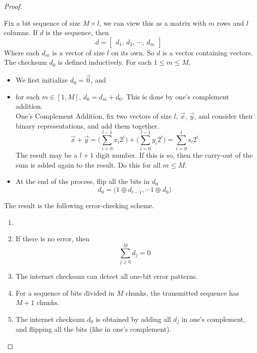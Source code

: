 \documentclass[../../main.tex]{subfiles}
\begin{document}
\begin{proof}
\begin{definition}
    Fix a bit sequence of size $M\times l$, we can view this as a matrix with $m$ rows and $l$ columns. If $d$ is the sequence, then
    \[d = \begin{bmatrix}d_1,\, d_2,\,\cdots,\,d_m\end{bmatrix}\]
    Where each $d_m$ is a vector of size $l$ on its own. So $d$ is a vector containing vectors.\\
    
    The checksum $d_0$ is defined inductively. For each $1\leq m\leq M$,
    \begin{itemize}
        \item We first initialize $d_0 = \vec{0}$, and
        \item for each $m\in[1,M]$, $d_0 = d_m + d_0$. This is done by one's complement addition.\\
        
        One's Complement Addition, fix two vectors of size $l$, $\vec{x}$, $\vec{y}$, and consider their binary representations, and add them together.
        \[
        \vec{x} + \vec{y} = \biggl(\sum_{i=0}^{l-1} x_i 2^i\biggr) + \biggl(\sum_{i=0}^{l-1} y_i 2^i\biggr) = \sum_{i=0}^{l} s_i 2^i
        \]
        The result may be a $l+1$ digit number. If this is so, then the carry-out of the sum is added again to the result. Do this for all $m\leq M$.\\
        \item At the end of the process, flip all the bits in $d_0$
        \[
        d_0 = \biggl(1\oplus d_{l-1},\cdots 1\oplus d_{0}\biggr)
        \]
    \end{itemize}
\end{definition}
    The result is the following error-checking scheme.
\begin{wtr}
\begin{enumerate}
        \item[]
        \item If there is no error, then
        \[
        \boxed{\sum_{j\geq 0}^M d_j=0}
        \]
        \item The internet checksum can detect all one-bit error patterns.
        \item For a sequence of bits divided in $M$ chunks, the transmitted sequence has $M+1$ chunks.
        \item The internet checksum $d_0$ is obtained by adding all $d_j$ in one's complement, and flipping all the bits (like in one's complement).
    \end{enumerate}
\end{wtr}    
\end{proof}
\end{document}
